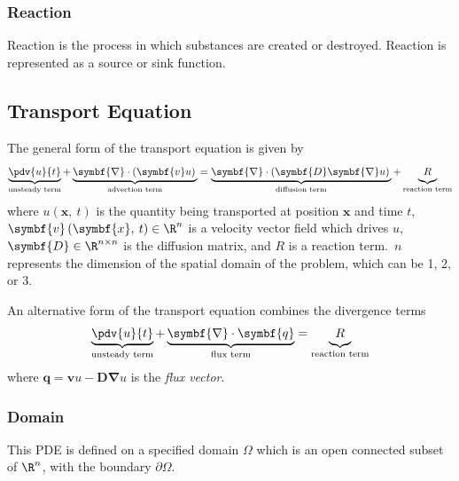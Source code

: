 \documentclass{article}
\begin{document}
\subsubsection{Reaction}
Reaction is the process in which substances are created or destroyed.
Reaction is represented as a source or sink function.
\subsection{Transport Equation}
The general form of the transport equation is given by
\begin{equation*}
    \underbrace{\pdv{u}{t}}_{\text{unsteady term}} + \underbrace{\symbf{\nabla} \cdot \left( \symbf{v} u \right) \vphantom{\pdv{u}{t}}}_{\text{advection term}} = \underbrace{\symbf{\nabla} \cdot \left( \symbf{D} \symbf{\nabla} u \right) \vphantom{\pdv{u}{t}}}_{\text{diffusion term}} + \underbrace{R \vphantom{\pdv{u}{t}}}_{\text{reaction term}}
\end{equation*}
where \(u\left( \symbf{x},\: t \right)\) is the quantity being transported
at position \(\symbf{x}\) and time \(t\), \(\symbf{v}\left( \symbf{x},\: t \right) \in \R^n\)
is a velocity vector field which drives \(u\),
\(\symbf{D} \in \R^{n \times n}\) is the diffusion matrix, and \(R\) is
a reaction term.\ \(n\) represents the dimension of the spatial domain
of the problem, which can be 1, 2, or 3.

An alternative form of the transport equation combines the divergence
terms
\begin{equation*}
    \underbrace{\pdv{u}{t} \vphantom{\pdv{u}{t}}}_{\text{unsteady term}} + \underbrace{\symbf{\nabla} \cdot \symbf{q} \vphantom{\pdv{u}{t}}}_{\text{flux term}} = \underbrace{R \vphantom{\pdv{u}{t}}}_{\text{reaction term}}
\end{equation*}
where \(\symbf{q} = \symbf{v} u - \symbf{D} \symbf{\nabla} u\) is the
\textit{flux vector}.
\subsubsection{Domain}
This PDE is defined on a specified domain \(\Omega\) which is an open
connected subset of \(\R^n\), with the boundary \(\partial \Omega\).
\end{document}
